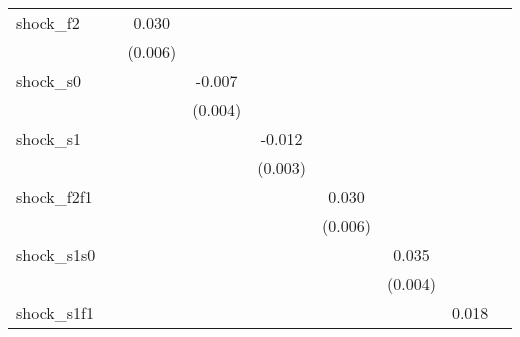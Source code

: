 {\begin{tabular}{l*{8}{c}}
\addlinespace
shock\_f2    &                     &       0.030\sym{***}&                     &                     &                     &                     &                     &                     \\
            &                     &     (0.006)         &                     &                     &                     &                     &                     &                     \\
\addlinespace
shock\_s0    &                     &                     &      -0.007\sym{**} &                     &                     &                     &                     &                     \\
            &                     &                     &     (0.004)         &                     &                     &                     &                     &                     \\
\addlinespace
shock\_s1    &                     &                     &                     &      -0.012\sym{***}&                     &                     &                     &                     \\
            &                     &                     &                     &     (0.003)         &                     &                     &                     &                     \\
\addlinespace
shock\_f2f1  &                     &                     &                     &                     &       0.030\sym{***}&                     &                     &                     \\
            &                     &                     &                     &                     &     (0.006)         &                     &                     &                     \\
\addlinespace
shock\_s1s0  &                     &                     &                     &                     &                     &       0.035\sym{***}&                     &                     \\
            &                     &                     &                     &                     &                     &     (0.004)         &                     &                     \\
\addlinespace
shock\_s1f1  &                     &                     &                     &                     &                     &                     &       0.018\sym{***}&                     \\

\end{tabular}}
